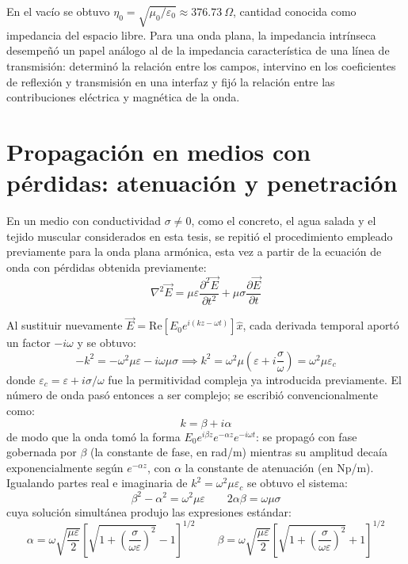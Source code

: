 En el vacío se obtuvo $\eta_0=\sqrt{\mu_0/\varepsilon_0}\approx376.73\ \Omega$, cantidad conocida como impedancia del espacio libre. Para una onda plana, la impedancia intrínseca desempeñó un papel análogo al de la impedancia característica de una línea de transmisión: determinó la relación entre los campos, intervino en los coeficientes de reflexión y transmisión en una interfaz \cite[ecs.~31--38]{ITU2025} y fijó la relación entre las contribuciones eléctrica y magnética de la onda.

\section{Propagación en medios con pérdidas: atenuación y penetración}
En un medio con conductividad $\sigma\neq0$, como el concreto, el agua salada y el tejido muscular considerados en esta tesis, se repitió el procedimiento empleado previamente para la onda plana armónica, esta vez a partir de la ecuación de onda con pérdidas obtenida previamente:
\begin{equation}
    \nabla^2\vec{E} = \mu\varepsilon\frac{\partial^2\vec{E}}{\partial t^2} + \mu\sigma\frac{\partial\vec{E}}{\partial t}
\end{equation}

Al sustituir nuevamente $\vec{E}=\text{Re}[E_0 e^{i(kz-\omega t)}]\hat{x}$, cada derivada temporal aportó un factor $-i\omega$ y se obtuvo:
\begin{equation}
    -k^2 = -\omega^2\mu\varepsilon - i\omega\mu\sigma \implies k^2 = \omega^2\mu\left(\varepsilon+i\frac{\sigma}{\omega}\right) = \omega^2\mu\varepsilon_c
\end{equation}
donde $\varepsilon_c = \varepsilon + i\sigma/\omega$ fue la permitividad compleja ya introducida previamente. El número de onda pasó entonces a ser complejo; se escribió convencionalmente como:
\begin{equation}
    k = \beta + i\alpha
\end{equation}
de modo que la onda tomó la forma $E_0 e^{i\beta z} e^{-\alpha z} e^{-i\omega t}$: se propagó con fase gobernada por $\beta$ (la constante de fase, en rad/m) mientras su amplitud decaía exponencialmente según $e^{-\alpha z}$, con $\alpha$ la constante de atenuación (en Np/m). Igualando partes real e imaginaria de $k^2=\omega^2\mu\varepsilon_c$ se obtuvo el sistema:
\begin{equation}
    \beta^2-\alpha^2 = \omega^2\mu\varepsilon \qquad 2\alpha\beta = \omega\mu\sigma
\end{equation}
cuya solución simultánea produjo las expresiones estándar:
\begin{equation}
    \alpha = \omega\sqrt{\frac{\mu\varepsilon}{2}}\left[\sqrt{1+\left(\frac{\sigma}{\omega\varepsilon}\right)^2}-1\right]^{1/2} \qquad \beta = \omega\sqrt{\frac{\mu\varepsilon}{2}}\left[\sqrt{1+\left(\frac{\sigma}{\omega\varepsilon}\right)^2}+1\right]^{1/2}
\end{equation}

